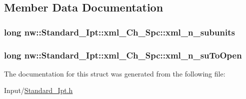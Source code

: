 \subsection{Member Data Documentation}
\hypertarget{structnw_1_1_standard___ipt_1_1xml___ch___spc_add361d89d7c6461ba8b6fb75dffa9b82}{
\subsubsection[{xml\+\_\+n\+\_\+subunits}]{\setlength{\rightskip}{0pt plus 5cm}long nw\+::\+Standard\+\_\+\+Ipt\+::xml\+\_\+\+Ch\+\_\+\+Spc\+::xml\+\_\+n\+\_\+subunits}}\label{structnw_1_1_standard___ipt_1_1xml___ch___spc_add361d89d7c6461ba8b6fb75dffa9b82}
\hypertarget{structnw_1_1_standard___ipt_1_1xml___ch___spc_a7bfa8a0c0cb063b0147a076e4dfcb5f9}{
\subsubsection[{xml\+\_\+n\+\_\+su\+To\+Open}]{\setlength{\rightskip}{0pt plus 5cm}long nw\+::\+Standard\+\_\+\+Ipt\+::xml\+\_\+\+Ch\+\_\+\+Spc\+::xml\+\_\+n\+\_\+su\+To\+Open}}\label{structnw_1_1_standard___ipt_1_1xml___ch___spc_a7bfa8a0c0cb063b0147a076e4dfcb5f9}


The documentation for this struct was generated from the following file\+:\begin{DoxyCompactItemize}
\item 
Input/\hyperlink{_standard___ipt_8h}{Standard\+\_\+\+Ipt.\+h}\end{DoxyCompactItemize}
